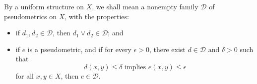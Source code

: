 By a uniform structure on $X$, we shall mean a nonempty family $\mathcal{D}$ of pseudometrics on $X$, with the properties:

\begin{itemize}
\item[(i)] if $d_1, d_2 \in \mathcal{D}$, then $d_1 \vee d_2 \in \mathcal{D}$; and
\item[(ii)] if $e$ is a pseudometric, and if for every $\epsilon > 0$, there exist $d \in \mathcal{D}$ and $\delta > 0$ such that
$$d(x, y) \leq \delta \text{ implies } e(x, y) \leq \epsilon$$
for all $x, y \in X$, then $e \in \mathcal{D}$.
\end{itemize}
